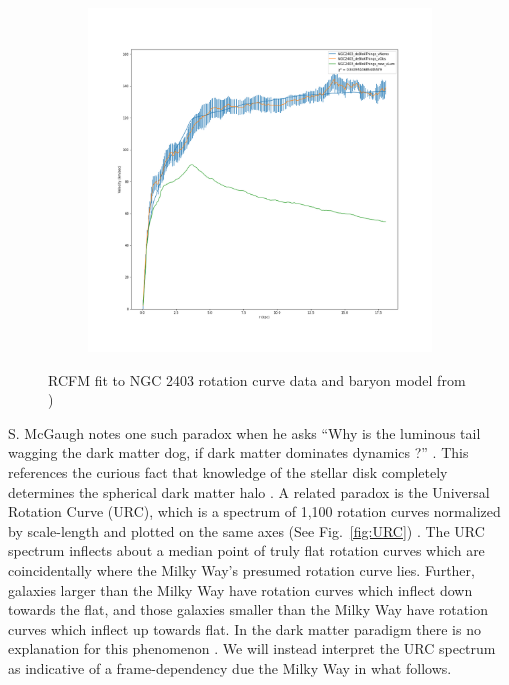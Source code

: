 \documentclass[reprint,%
 amsmath,amssymb,
 aps,
]{revtex4-1}
\begin{document}
 
   \begin{figure}[h!] 
    \begin{subfigure}[c]{0.95\linewidth}
    \centering
    \includegraphics[width=0.95\linewidth]{figures/NGC2403_deBlokThings_XueSofue}
  \end{subfigure}%
  \caption{ RCFM fit to  NGC 2403  rotation curve data and   baryon model from  \citet{Blok1})}  \label{fig:NGC2403RCFM} 
\end{figure}



  S. McGaugh  notes one such paradox when he asks   ``Why is the luminous tail wagging the dark matter dog,  if dark matter dominates dynamics ?'' \cite{1999McGaugh,McGaugh2016RAR}. This references the  curious fact   that knowledge  of 
 the   stellar   disk   completely  determines the spherical dark matter halo \cite{2004ApJ...609..652M}. A   related paradox is the Universal Rotation Curve (URC), which is a spectrum of   1,100  rotation curves normalized by scale-length and plotted on the same axes 
 (See Fig.~\ref{fig:URC})  \cite{salucci,Persic,1978Rubin,10.1111/j.1365-2966.2007.11696.x}. The URC spectrum   inflects about a median point of truly flat rotation curves which are coincidentally where the Milky Way's presumed rotation curve lies.  Further,  galaxies larger than the Milky Way have 
 rotation curves which    inflect down towards the   flat, and those galaxies smaller than the Milky Way have rotation curves which inflect up towards flat.
 In the dark matter paradigm there is no explanation for  this phenomenon \cite{MCGAUGH2021220}. We will instead interpret the URC spectrum as indicative of   a frame-dependency due the Milky Way in what follows. 
\end{document}

